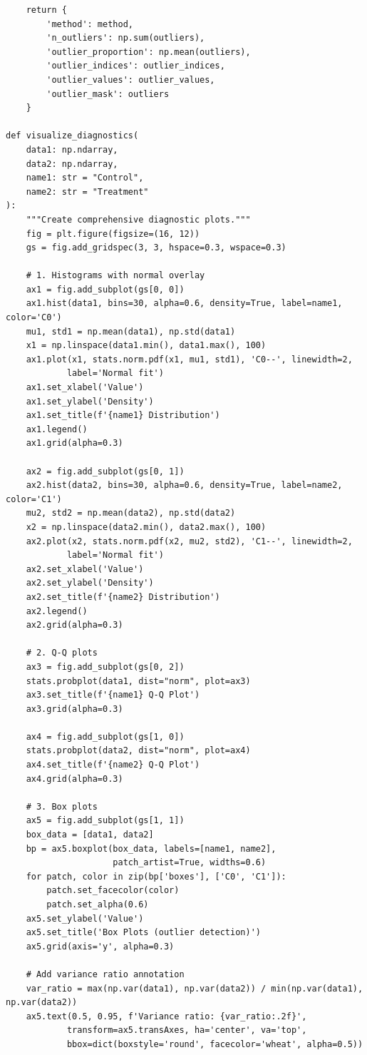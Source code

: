 \begin{lstlisting}
    return {
        'method': method,
        'n_outliers': np.sum(outliers),
        'outlier_proportion': np.mean(outliers),
        'outlier_indices': outlier_indices,
        'outlier_values': outlier_values,
        'outlier_mask': outliers
    }

def visualize_diagnostics(
    data1: np.ndarray,
    data2: np.ndarray,
    name1: str = "Control",
    name2: str = "Treatment"
):
    """Create comprehensive diagnostic plots."""
    fig = plt.figure(figsize=(16, 12))
    gs = fig.add_gridspec(3, 3, hspace=0.3, wspace=0.3)

    # 1. Histograms with normal overlay
    ax1 = fig.add_subplot(gs[0, 0])
    ax1.hist(data1, bins=30, alpha=0.6, density=True, label=name1, color='C0')
    mu1, std1 = np.mean(data1), np.std(data1)
    x1 = np.linspace(data1.min(), data1.max(), 100)
    ax1.plot(x1, stats.norm.pdf(x1, mu1, std1), 'C0--', linewidth=2,
            label='Normal fit')
    ax1.set_xlabel('Value')
    ax1.set_ylabel('Density')
    ax1.set_title(f'{name1} Distribution')
    ax1.legend()
    ax1.grid(alpha=0.3)

    ax2 = fig.add_subplot(gs[0, 1])
    ax2.hist(data2, bins=30, alpha=0.6, density=True, label=name2, color='C1')
    mu2, std2 = np.mean(data2), np.std(data2)
    x2 = np.linspace(data2.min(), data2.max(), 100)
    ax2.plot(x2, stats.norm.pdf(x2, mu2, std2), 'C1--', linewidth=2,
            label='Normal fit')
    ax2.set_xlabel('Value')
    ax2.set_ylabel('Density')
    ax2.set_title(f'{name2} Distribution')
    ax2.legend()
    ax2.grid(alpha=0.3)

    # 2. Q-Q plots
    ax3 = fig.add_subplot(gs[0, 2])
    stats.probplot(data1, dist="norm", plot=ax3)
    ax3.set_title(f'{name1} Q-Q Plot')
    ax3.grid(alpha=0.3)

    ax4 = fig.add_subplot(gs[1, 0])
    stats.probplot(data2, dist="norm", plot=ax4)
    ax4.set_title(f'{name2} Q-Q Plot')
    ax4.grid(alpha=0.3)

    # 3. Box plots
    ax5 = fig.add_subplot(gs[1, 1])
    box_data = [data1, data2]
    bp = ax5.boxplot(box_data, labels=[name1, name2],
                     patch_artist=True, widths=0.6)
    for patch, color in zip(bp['boxes'], ['C0', 'C1']):
        patch.set_facecolor(color)
        patch.set_alpha(0.6)
    ax5.set_ylabel('Value')
    ax5.set_title('Box Plots (outlier detection)')
    ax5.grid(axis='y', alpha=0.3)

    # Add variance ratio annotation
    var_ratio = max(np.var(data1), np.var(data2)) / min(np.var(data1), np.var(data2))
    ax5.text(0.5, 0.95, f'Variance ratio: {var_ratio:.2f}',
            transform=ax5.transAxes, ha='center', va='top',
            bbox=dict(boxstyle='round', facecolor='wheat', alpha=0.5))


\end{lstlisting}
